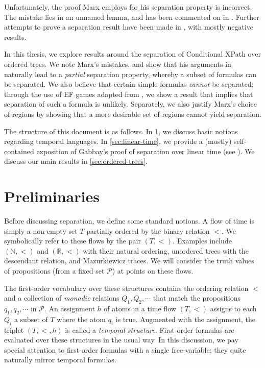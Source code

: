 \documentclass[a4paper,UKenglish,cleveref, autoref, thm-restate, numberwithinsect]{lipics-v2021}
\begin{document}
Unfortunately, the proof Marx employs for his separation property is incorrect. The mistake lies in an unnamed lemma, and has been commented on in \cite{BeJe07, nwtl}. Further attempts to prove a separation result have been made in \cite{BeCl16}, with mostly negative results.

In this thesis, we explore results around the separation of Conditional XPath over ordered trees. We note Marx's mistakes, and show that his arguments in \cite{xpathComplete} naturally lead to a \textit{partial} separation property, whereby a subset of formulas can be separated. We also believe that certain simple formulas \textit{cannot} be separated; through the use of EF games adapted from \cite{EtWi00}, we show a result that implies that separation of such a formula is unlikely. Separately, we also justify Marx's choice of regions by showing that a more desirable set of regions cannot yield separation.

The structure of this document is as follows. In \cref{sec:preliminaries}, we discuss basic notions regarding temporal languages. In \cref{sec:linear-time}, we provide a (mostly) self-contained exposition of Gabbay's proof of separation over linear time (see \cite{DecPastImpFuture89, gabbay1994}). We discuss our main results in \cref{sec:ordered-trees}.

\section{Preliminaries}
\label{sec:preliminaries}

Before discussing separation, we define some standard notions. A flow of time is simply a non-empty set $T$ partially ordered by the binary relation $<$. We symbolically refer to these flows by the pair $(T, <)$. Examples include $(\mathbb{N}, <)$ and $(\mathbb{R}, <)$ with their natural ordering, unordered trees with the descendant relation, and Mazurkiewicz traces. We will consider the truth values of propositions (from a fixed set $\mathcal{P}$) at points on these flows.

The first-order vocabulary over these structures contains the ordering relation $<$ and a collection of \textit{monadic} relations $Q_1, Q_2, \cdots$ that match the propositions $q_1, q_2, \cdots$ in $\mathcal{P}$. An assignment $h$ of atoms in a time flow $(T, <)$ assigns to each $Q_i$ a subset of $T$ where the atom $q_i$ is true. Augmented with the assignment, the triplet $(T, <, h)$ is called a \textit{temporal structure}. First-order formulas are evaluated over these structures in the usual way. In this discussion, we pay special attention to first-order formulas with a single free-variable; they quite naturally mirror temporal formulas.
\end{document}
